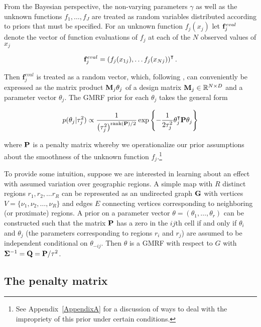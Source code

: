 From the Bayesian perspective, the non-varying parameters $\gamma$ as well as the unknown 
functions $f_1, \dots, f_J$ are treated as random variables distributed according to priors that must 
be specified. For an unknown function $f_j(x_j)$ let $\mathbf{f}_j^{eval}$ denote the vector of function 
evaluations of $f_j$ at each of the $N$ observed values of $x_j$ 

\begin{equation*}
\mathbf{f}_j^{eval} = \left(f_j(x_{1j}), \dots f_j(x_{Nj})\right)^\intercal.  
 \end{equation*}
 
\noindent Then $\mathbf{f}_j^{eval}$ is treated as a random vector, which, following 
, can conveniently be expressed as the matrix product 
$\mathbf{M}_j \theta_j$ of a design matrix $\mathbf{M}_j \in \mathbb{R}^{N \times D}$ and a 
parameter vector $\theta_j$. The GMRF prior for each $\theta_j$ takes the general form

\begin{equation*}
p(\theta_j | \tau^2_j) 
\propto 
\frac{1}{\left(\tau^2_j\right)^{{\rm rank}(\mathbf{P})/2} }
\exp{\left\{-\frac{1}{2\tau^2_j} \theta_j^\intercal \mathbf{P} \theta_j\right\}}
\end{equation*}

\noindent where $\mathbf{P}$ is a penalty matrix whereby we operationalize our prior assumptions 
about the smoothness of the unknown function $f_j$.\footnote{See Appendix~\ref{AppendixA} 
for a discussion of ways to deal with the impropriety of this prior under certain conditions.}

To provide some intuition, suppose we are interested in learning about an effect with assumed 
variation over geographic regions.  A simple map with $R$ distinct regions $r_1, r_2, \dots r_R$ can 
be represented as an undirected graph $\mathbf{G}$ with vertices $V = \{\nu_1, \nu_2, \dots, \nu_R\}$ and 
edges $E$ connecting vertices corresponding to neighboring (or proximate) regions. A prior on a 
parameter vector $\theta = (\theta_1, \dots, \theta_r)$ can be constructed such that the matrix 
$\mathbf{P}$ has a zero in the $ij$th cell if and only if $\theta_i$ and $\theta_j$ (the parameters 
corresponding to regions $r_i$ and $r_j$) are assumed to be independent conditional on 
$\theta_{-ij}$. Then $\theta$ is a GMRF with respect to $G$ with 
$\boldsymbol{\Sigma}^{-1} = \mathbf{Q} = \mathbf{P}/\tau^2$. 


\subsection{The penalty matrix} 
\label{penalty_matrix}

